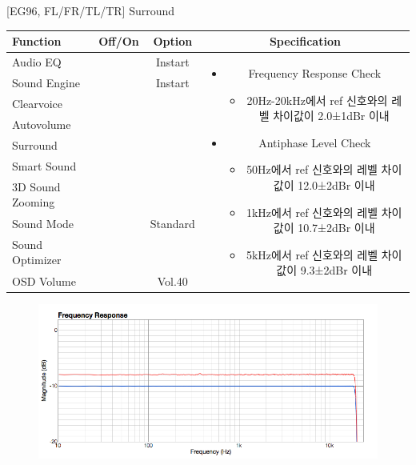 \documentclass{beamer}
\begin{document}
\begin{frame}[t]{[EG96, FL/FR/TL/TR] Surround}
\begin{tiny}
\begin{tabular}{@{}lccc@{}}
\toprule
Function & Off/On & Option & Specification \\
\midrule
Audio EQ & \color{black}{Off} & Instart &
\multirow{10}{60mm}{
\begin{itemize}\vspace{-3mm}
\item Frequency Response Check
	\begin{itemize}
	\item 20Hz-20kHz에서 ref 신호와의 레벨 차이값이 2.0±1dBr 이내
	\end{itemize}
\item Antiphase Level Check
	\begin{itemize}
	\item 50Hz에서 ref 신호와의 레벨 차이값이 12.0±2dBr 이내
	\item 1kHz에서 ref 신호와의 레벨 차이값이 10.7±2dBr 이내
	\item 5kHz에서 ref 신호와의 레벨 차이값이 9.3±2dBr 이내
	\end{itemize}
\end{itemize}
} \\
Sound Engine & \color{blue}{On} & Instart & \\
Clearvoice & \color{black}{Off} & & \\
Autovolume & \color{black}{Off} & & \\
Surround & \color{blue}{On} & & \\
Smart Sound & \color{black}{Off} & & \\
3D Sound Zooming & \color{black}{Off} & & \\
Sound Mode & \color{blue}{On} & Standard & \\
Sound Optimizer & \color{black}{Off} & & \\
OSD Volume & \color{blue}{On} & Vol.40 & \\
\midrule
\end{tabular}
\end{tiny}

\begin{figure}[b]
\includegraphics[height=0.4\textwidth]{figure/EG96/surround.png}
\end{figure}

\end{frame}
\end{document}
